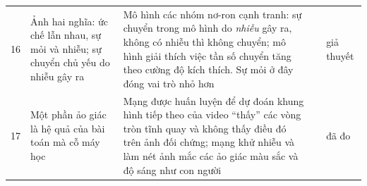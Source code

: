 {\begin{longtable}{>{\raggedright}p{0.5cm}>{\raggedright}p{4.0cm}>{\raggedright}p{5.6cm}>{\raggedright}p{2.3cm}>{\raggedright\arraybackslash}p{1.7cm}}
16 & Ảnh hai nghĩa: ức chế lẫn nhau, sự mỏi và nhiễu; sự chuyển chủ yếu do nhiễu gây ra & Mô hình các nhóm nơ-ron cạnh tranh: sự chuyển trong mô hình do \emph{nhiễu} gây ra, không có nhiễu thì không chuyển; mô hình giải thích việc tần số chuyển tăng theo cường độ kích thích. Sự mỏi ở đây đóng vai trò nhỏ hơn & \cite{MorenoBote2007} & giả thuyết \\
17 & Một phần ảo giác là hệ quả của bài toán mà cỗ máy học & Mạng được huấn luyện để dự đoán khung hình tiếp theo của video ``thấy'' các vòng tròn tĩnh quay và không thấy điều đó trên ảnh đối chứng; mạng khử nhiễu và làm nét ảnh mắc các ảo giác màu sắc và độ sáng như con người & \cite{Watanabe2018,GomezVilla2020} & đã đo \\
\bottomrule
\end{longtable}}
